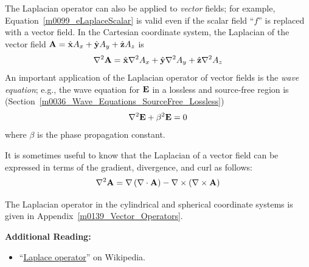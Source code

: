 The Laplacian operator can also be applied to \emph{vector} fields; for example, Equation~\ref{m0099_eLaplaceScalar} is valid even if the scalar field ``$f$'' is replaced with a vector field.  
In the Cartesian coordinate system, the Laplacian of the vector field ${\bf A} = \hat{\bf x}A_x + \hat{\bf y}A_y + \hat{\bf z}A_z$ is
%
\begin{equation}
\nabla^2 {\bf A} = \hat{\bf x}\nabla^2 A_x + \hat{\bf y}\nabla^2 A_y + \hat{\bf z}\nabla^2 A_z
\end{equation}
%
An important application of the Laplacian operator of vector fields is the \emph{wave equation}; 
e.g., the wave equation for ${\bf E}$ in a lossless and source-free region is (Section~\ref{m0036_Wave_Equations_SourceFree_Lossless})
%
\begin{equation}
\nabla^2{\bf E} + \beta^2{\bf E} = 0
\end{equation}
%
where $\beta$ is the phase propagation constant.

It is sometimes useful to know that the Laplacian of a vector field can be expressed in terms of the gradient, divergence, and curl as follows:
%
\begin{equation}
\nabla^2 {\bf A} = \nabla\left(\nabla\cdot{\bf A}\right) - \nabla\times\left(\nabla\times{\bf A}\right)
\end{equation}

The Laplacian operator in the cylindrical and spherical coordinate systems is given in Appendix~\ref{m0139_Vector_Operators}.


{\bf Additional Reading:}
\begin{itemize}
\item ``\href{https://en.wikipedia.org/wiki/Laplace_operator}{Laplace operator}'' on Wikipedia.
\end{itemize}

